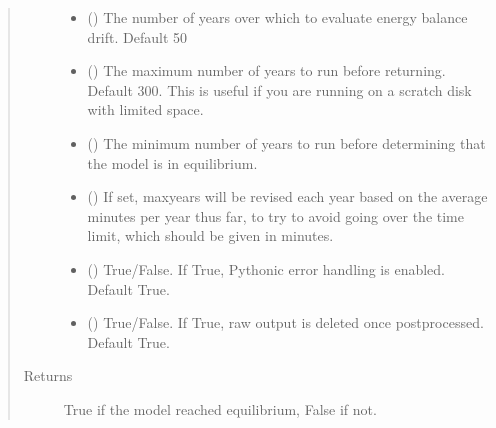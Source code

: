 \documentclass[letterpaper,10pt,english]{sphinxmanual}
\begin{document}
\begin{fulllineitems}
\begin{fulllineitems}
\begin{quote}
\begin{description}
\begin{itemize}
\item {} 
 (\sphinxstyleliteralemphasis{\sphinxupquote{, }}) \textendash{} The number of years over which to evaluate energy balance drift. Default 50

\item {} 
 (\sphinxstyleliteralemphasis{\sphinxupquote{, }}) \textendash{} The maximum number of years to run before returning. Default 300. This is
useful if you are running on a scratch disk with limited space.

\item {} 
 (\sphinxstyleliteralemphasis{\sphinxupquote{, }}) \textendash{} The minimum number of years to run before determining that the model is in
equilibrium.

\item {} 
 (\sphinxstyleliteralemphasis{\sphinxupquote{, }}) \textendash{} If set, maxyears will be revised each year based on the average minutes
per year thus far, to try to avoid going over the time limit, which should
be given in minutes.

\item {} 
 (\sphinxstyleliteralemphasis{\sphinxupquote{, }}) \textendash{} True/False. If True, Pythonic error handling is enabled. Default True.

\item {} 
 (\sphinxstyleliteralemphasis{\sphinxupquote{, }}) \textendash{} True/False. If True, raw output is deleted once postprocessed. Default True.

\end{itemize}

\item[{Returns}] \leavevmode
True if the model reached equilibrium, False if not.


\end{description}
\end{quote}
\end{fulllineitems}
\end{fulllineitems}
\end{document}
